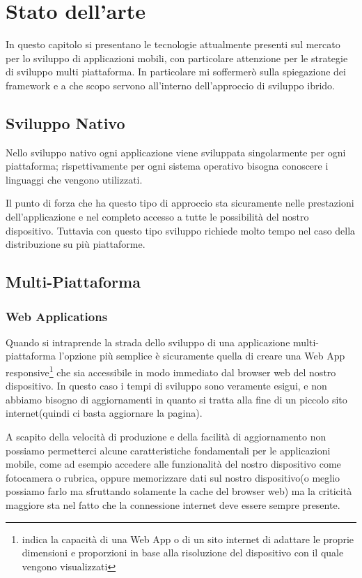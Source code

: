 \chapter{Stato dell'arte} 
In questo capitolo si presentano le tecnologie attualmente presenti sul mercato per lo sviluppo di applicazioni mobili, con particolare attenzione per le strategie di sviluppo multi piattaforma. In particolare mi soffermerò sulla spiegazione dei framework e a che scopo servono all'interno dell'approccio di sviluppo ibrido.
\section{Sviluppo Nativo}
Nello sviluppo nativo ogni applicazione viene sviluppata singolarmente per ogni piattaforma; rispettivamente per ogni sistema operativo bisogna conoscere i linguaggi che vengono utilizzati.


Il punto di forza che ha questo tipo di approccio sta sicuramente nelle prestazioni dell'applicazione e nel completo accesso a tutte le possibilità del nostro dispositivo. Tuttavia con questo tipo sviluppo richiede molto tempo nel caso della distribuzione su più piattaforme.
\section{Multi-Piattaforma}

\subsection{Web Applications}
Quando si intraprende la strada dello sviluppo di una applicazione multi-piattaforma l'opzione più semplice è sicuramente quella di creare una Web App responsive\footnote{indica la capacità di una Web App o di un sito internet di adattare le proprie dimensioni e proporzioni in base alla risoluzione del dispositivo con il quale vengono visualizzati} che sia accessibile in modo immediato dal browser web del nostro dispositivo. In questo caso i tempi di sviluppo sono veramente esigui, e non abbiamo bisogno di aggiornamenti in quanto si tratta alla fine di un piccolo sito internet(quindi ci basta aggiornare la pagina).

A scapito della velocità di produzione e della facilità di aggiornamento non possiamo permetterci alcune caratteristiche fondamentali per le applicazioni mobile, come ad esempio accedere alle funzionalità del nostro dispositivo come fotocamera o rubrica, oppure memorizzare dati sul nostro dispositivo(o meglio possiamo farlo ma sfruttando solamente la cache del browser web) ma la criticità maggiore sta nel fatto che la connessione internet deve essere sempre presente. 

